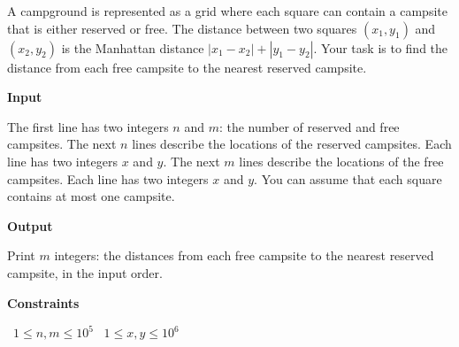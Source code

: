 A campground is represented as a grid where each square can contain a campsite that is either reserved or free. The distance between two squares $(x_1, y_1)$ and $(x_2, y_2)$ is the Manhattan distance $|x_1 - x_2| + |y_1 - y_2|$.
Your task is to find the distance from each free campsite to the nearest reserved campsite.

\vspace{0.3cm}\noindent\textbf{Input}

The first line has two integers $n$ and $m$:
the number of reserved and free campsites.
The next $n$ lines describe the locations of the reserved campsites. Each line has two integers $x$ and $y$.
The next $m$ lines describe the locations of the free campsites. Each line has two integers $x$ and $y$.
You can assume that each square contains at most one campsite.

\vspace{0.3cm}\noindent\textbf{Output}

Print $m$ integers: the distances from each free campsite to the nearest reserved campsite, in the input order.

\vspace{0.3cm}\noindent\textbf{Constraints}

\textbullet\ $1 \le n, m \le 10^5$
\textbullet\ $1 \le x, y \le 10^6$